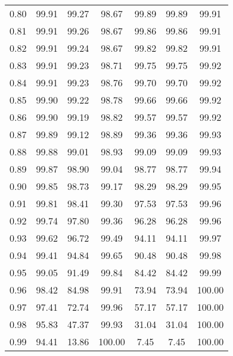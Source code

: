 \begin{tabular}{|c|c|c|c|c|c|c|}
      0.80 &     99.91 &     99.27 &      98.67 &   99.89 &      99.89 &         99.91 \\
      0.81 &     99.91 &     99.26 &      98.67 &   99.86 &      99.86 &         99.91 \\
      0.82 &     99.91 &     99.24 &      98.67 &   99.82 &      99.82 &         99.91 \\
      0.83 &     99.91 &     99.23 &      98.71 &   99.75 &      99.75 &         99.92 \\
      0.84 &     99.91 &     99.23 &      98.76 &   99.70 &      99.70 &         99.92 \\
      0.85 &     99.90 &     99.22 &      98.78 &   99.66 &      99.66 &         99.92 \\
      0.86 &     99.90 &     99.19 &      98.82 &   99.57 &      99.57 &         99.92 \\
      0.87 &     99.89 &     99.12 &      98.89 &   99.36 &      99.36 &         99.93 \\
      0.88 &     99.88 &     99.01 &      98.93 &   99.09 &      99.09 &         99.93 \\
      0.89 &     99.87 &     98.90 &      99.04 &   98.77 &      98.77 &         99.94 \\
      0.90 &     99.85 &     98.73 &      99.17 &   98.29 &      98.29 &         99.95 \\
      0.91 &     99.81 &     98.41 &      99.30 &   97.53 &      97.53 &         99.96 \\
      0.92 &     99.74 &     97.80 &      99.36 &   96.28 &      96.28 &         99.96 \\
      0.93 &     99.62 &     96.72 &      99.49 &   94.11 &      94.11 &         99.97 \\
      0.94 &     99.41 &     94.84 &      99.65 &   90.48 &      90.48 &         99.98 \\
      0.95 &     99.05 &     91.49 &      99.84 &   84.42 &      84.42 &         99.99 \\
      0.96 &     98.42 &     84.98 &      99.91 &   73.94 &      73.94 &        100.00 \\
      0.97 &     97.41 &     72.74 &      99.96 &   57.17 &      57.17 &        100.00 \\
      0.98 &     95.83 &     47.37 &      99.93 &   31.04 &      31.04 &        100.00 \\
      0.99 &     94.41 &     13.86 &     100.00 &    7.45 &       7.45 &        100.00 \\
\bottomrule
\end{tabular}
